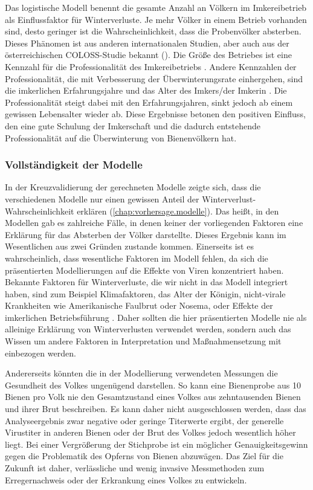 Das logistische Modell benennt die gesamte Anzahl an Völkern im Imkereibetrieb als Einflussfaktor für Winterverluste. Je mehr Völker in einem Betrieb vorhanden sind, desto geringer ist die Wahrscheinlichkeit, dass die Probenvölker absterben. Dieses Phänomen ist aus anderen internationalen Studien, aber auch aus der österreichischen COLOSS-Studie bekannt (\cite{brodschneider2016,lee2015,jacques2017,oberreiter2020,vanderzee2014}). Die Größe des Betriebes ist eine Kennzahl für die Professionalität des Imkereibetriebs \citep{jacques2017}. Andere Kennzahlen der Professionalität, die mit Verbesserung der Überwinterungsrate einhergehen, sind die imkerlichen Erfahrungsjahre und das Alter des Imkers/der Imkerin \citep{jacques2017,morawetz2019}. Die Professionalität steigt dabei mit den Erfahrungsjahren, sinkt jedoch ab einem gewissen Lebensalter wieder ab. Diese Ergebnisse betonen den positiven Einfluss, den eine gute Schulung der Imkerschaft und die dadurch entstehende Professionalität auf die Überwinterung von Bienenvölkern hat.

\subsubsection{Vollständigkeit der Modelle}

In der Kreuzvalidierung der gerechneten Modelle zeigte sich, dass die verschiedenen Modelle nur einen gewissen Anteil der Winterverlust-Wahrscheinlichkeit erklären (\cref{chap:vorhersage.modelle}). Das heißt, in den Modellen gab es zahlreiche Fälle, in denen keiner der vorliegenden Faktoren eine Erklärung für das Absterben der Völker darstellte. Dieses Ergebnis kann im Wesentlichen aus zwei Gründen zustande kommen. Einerseits ist es wahrscheinlich, dass wesentliche Faktoren im Modell fehlen, da sich die präsentierten Modellierungen auf die Effekte von Viren konzentriert haben. Bekannte Faktoren für Winterverluste, die wir nicht in das Modell integriert haben, sind zum Beispiel Klimafaktoren, das Alter der Königin, nicht-virale Krankheiten wie Amerikanische Faulbrut oder Nosema, oder Effekte der imkerlichen Betriebsführung \citep{brodschneider2018,chauzat2016,morawetz2019,switanek2017}. Daher sollten die hier präsentierten Modelle nie als alleinige Erklärung von Winterverlusten verwendet werden, sondern auch das Wissen um andere Faktoren in Interpretation und Maßnahmensetzung mit einbezogen werden.

Andererseits könnten die in der Modellierung verwendeten Messungen die Gesundheit des Volkes ungenügend darstellen. So kann eine Bienenprobe aus 10 Bienen pro Volk nie den Gesamtzustand eines Volkes aus zehntausenden Bienen und ihrer Brut beschreiben. Es kann daher nicht ausgeschlossen werden, dass das Analyseergebnis zwar negative oder geringe Titerwerte ergibt, der generelle Virustiter in anderen Bienen oder der Brut des Volkes jedoch wesentlich höher liegt. Bei einer Vergrößerung der Stichprobe ist ein möglicher Genauigkeitsgewinn gegen die Problematik des Opferns von Bienen abzuwägen. Das Ziel für die Zukunft ist daher, verlässliche und wenig invasive Messmethoden zum Erregernachweis oder der Erkrankung eines Volkes zu entwickeln.

